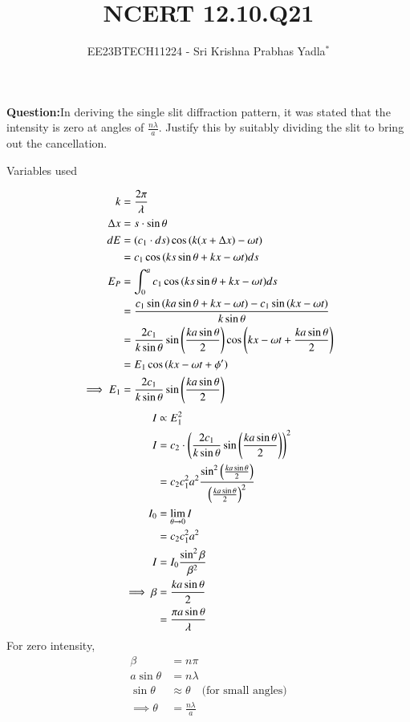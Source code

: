 \documentclass[journal,12pt,twocolumn]{IEEEtran}
\theoremstyle{remark}
\begin{document}

\vspace{3cm}

\title{NCERT 12.10.Q21}
\author{EE23BTECH11224 - Sri Krishna Prabhas Yadla$^{*}$%
}
\maketitle
\newpage
\bigskip

\renewcommand{\thefigure}{\arabic{figure}}
\renewcommand{\thetable}{\arabic{table}}


\vspace{3cm}
\textbf{Question:}In deriving the single slit diffraction pattern, it was stated that the intensity is zero at angles of $\frac{n\lambda}{a}$. Justify this by suitably dividing the slit to bring out the cancellation.
\\
\solution
\begin{table}[htbp]
\centering
\def\arraystrech{1.5}

\caption{Variables used}
\label{tab:1.12_10_Q21}
\end{table}
\begin{align}
    k &= \frac{2\pi}{\lambda} \\
\Delta x &= s\cdot \sin{\theta}\\
    dE &= (c_1\cdot ds)\cos{(k(x+\Delta x)-\omega t)} \\
    &= c_1 \cos{(ks\sin{\theta} + kx-\omega t)} ds \\
    E_P &= \int_{0}^{a} c_1\cos{(ks\sin{\theta} + kx-\omega t)} ds \\
    &= \frac{c_1 \sin{(ka\sin{\theta} + kx-\omega t)}-c_1\sin{(kx-\omega t)}}{k\sin{\theta}} \\
    &= \frac{2c_1}{k\sin{\theta}}\sin{ \ensuremath{\left(\frac{ka\sin{\theta}}{2}\right)}}\cos{\ensuremath{\left(kx-\omega t+ \frac{ka\sin{\theta}}{2}\right)}} \\
    &= E_1 \cos{(kx-\omega t+ \phi')} \\
    \implies E_1 &= \frac{2c_1}{k\sin{\theta}}\sin{ \ensuremath{\left(\frac{ka\sin{\theta}}{2}\right)}}
\end{align}
\begin{align}
    I &\propto E_1^2  \\
    I &= c_2 \cdot \left(\frac{2c_1}{k\sin{\theta}}\sin{ \ensuremath{\left( \frac{ka\sin{\theta}}{2}\right)}}\right)^2 \\
    &= c_2c_1^2a^2 \frac{\sin^2{\left(\frac{ka\sin{\theta}}{2}\right)}}{\left(\frac{ka\sin{\theta}}{2}\right)^2}\\
    I_0 &= \lim_{\theta\to 0} I\\
        &= c_2c_1^2a^2   \\
    I &= I_0 \frac{\sin^2{\beta}}{\beta^2}  \\
\implies    \beta &= \frac{ka\sin{\theta}}{2} \\
		  &= \frac{\pi a\sin{\theta}}{\lambda}
\end{align}
For zero intensity,
\begin{align}
    \beta &= n\pi \\
    a\sin{\theta} &= n\lambda \\
    \sin{\theta} &\approx \theta \quad \text{(for small angles)} \\
    \implies \theta &= \frac{n\lambda}{a}
\end{align}
\end{document}
